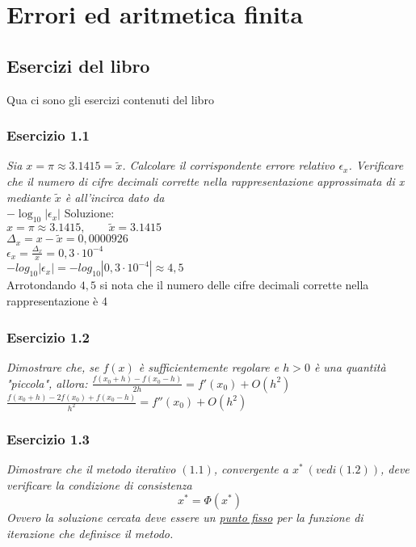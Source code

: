 \chapter{Errori ed aritmetica finita}
\section{Esercizi del libro}
Qua ci sono gli esercizi contenuti del libro
\subsection{Esercizio 1.1}
\emph{Sia $ x = \pi \approx 3.1415 = \tilde{x} $. Calcolare il corrispondente errore relativo $\epsilon_{x}$.
Verificare che il numero di cifre decimali corrette nella rappresentazione approssimata di x mediante $\tilde{x}$ è all'incirca dato da}  \\

\center$-\log_{10}|\epsilon_{x}|$
\flushleft Soluzione:\\
\center
$ x = \pi \approx 3.1415, \qquad \tilde{x} = 3.1415 $ \\ \vspace{1ex}
$ \Delta_{x} = x - \tilde{x} = 0,0000926$ \\ \vspace{1ex}
$ \epsilon_{x} = \frac{\Delta_{x}}{x} = 0,3 \cdot 10^{-4} $\\ \vspace{1ex}
$ -log_{10} | \epsilon_{x} | = -log_{10} | 0,3 \cdot 10^{-4} | \approx 4,5  $\\ \vspace{1ex}
\flushleft Arrotondando $ 4,5 $ si nota che il numero delle cifre decimali corrette nella rappresentazione è 4

\subsection{Esercizio 1.2} 
\emph{Dimostrare che, se $f(x)$ è sufficientemente regolare e $ h> 0 $ è una quantità "piccola", allora:
\center$\frac{f(x_{0}+h)-f(x_{0}-h)}{2h} = f'(x_{0})+O(h^2)$ \\
\vspace{1em}
$\frac{f(x_{0}+h)-2f(x_{0})+f(x_{0}-h)}{h^2} = f''(x_{0})+O(h^2) $
\flushleft}
\subsection{Esercizio 1.3} 
\emph{Dimostrare che il metodo iterativo $(1.1) $, convergente a $ x^* \ (vedi(1.2)) $, deve verificare la condizione di consistenza}
$$ x^* =  \Phi(x^*)$$
\emph{Ovvero la soluzione cercata deve essere un \underline{punto fisso} per la funzione di iterazione che definisce il metodo.}
